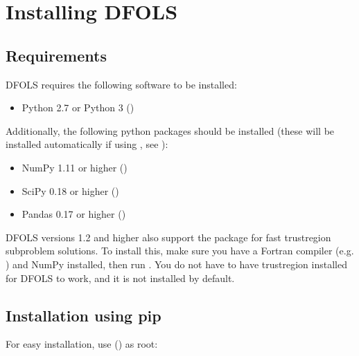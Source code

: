 \documentclass[letterpaper,10pt,english]{sphinxmanual}
\begin{document}
\chapter{Installing DFO\sphinxhyphen{}LS}
\label{\detokenize{install:installing-dfo-ls}}\label{\detokenize{install::doc}}

\section{Requirements}
\label{\detokenize{install:requirements}}
DFO\sphinxhyphen{}LS requires the following software to be installed:
\begin{itemize}
\item {} 
Python 2.7 or Python 3 ()

\end{itemize}

Additionally, the following python packages should be installed (these will be installed automatically if using , see {\hyperref[\detokenize{install:installation-using-pip}]{}}):
\begin{itemize}
\item {} 
NumPy 1.11 or higher ()

\item {} 
SciPy 0.18 or higher ()

\item {} 
Pandas 0.17 or higher ()

\end{itemize}

 DFO\sphinxhyphen{}LS versions 1.2 and higher also support the  package for fast trust\sphinxhyphen{}region subproblem solutions. To install this, make sure you have a Fortran compiler (e.g. ) and NumPy installed, then run . You do not have to have trustregion installed for DFO\sphinxhyphen{}LS to work, and it is not installed by default.


\section{Installation using pip}
\label{\detokenize{install:installation-using-pip}}
For easy installation, use  () as root:
\end{document}

